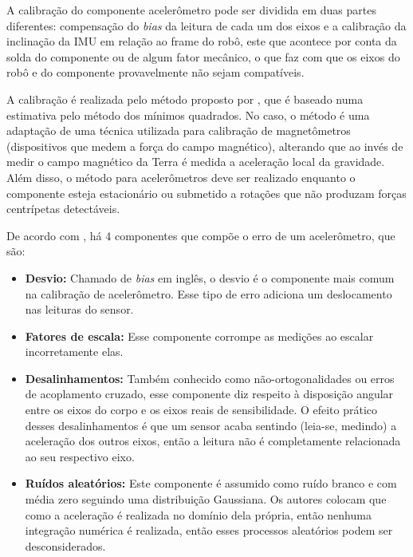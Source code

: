 \documentclass[acronym, symbols, table]{fei}
\begin{document}
			A calibração do componente acelerômetro pode ser dividida em duas partes diferentes: compensação do \textit{bias} da leitura de cada um dos eixos e a calibração da inclinação da IMU em relação ao frame do robô, este que acontece por conta da solda do componente ou de algum fator mecânico, o que faz com que os eixos do robô e do componente provavelmente não sejam compatíveis.
			
			A calibração é realizada pelo método proposto por \textcite{menezes2020triaxial}, que é baseado numa estimativa pelo método dos mínimos quadrados. No caso, o método é uma adaptação de uma técnica utilizada para calibração de magnetômetros (dispositivos que medem a força do campo magnético), alterando que ao invés de medir o campo magnético da Terra é medida a aceleração local da gravidade. Além disso, o método para acelerômetros deve ser realizado enquanto o componente esteja estacionário ou submetido a rotações que não produzam forças centrípetas detectáveis.
			
			De acordo com \textcite{menezes2020triaxial}, há 4 componentes que compõe o erro de um acelerômetro, que são:
			
			\begin{itemize}
				\item \textbf{Desvio:} Chamado de \textit{bias} em inglês, o desvio é o componente mais comum na calibração de acelerômetro. Esse tipo de erro adiciona um deslocamento nas leituras do sensor.
				
				\item \textbf{Fatores de escala:} Esse componente corrompe as medições ao escalar incorretamente elas.
				
				\item \textbf{Desalinhamentos:} Também conhecido como não-ortogonalidades ou erros de acoplamento cruzado, esse componente diz respeito à disposição angular entre os eixos do corpo e os eixos reais de sensibilidade. O efeito prático desses desalinhamentos é que um sensor acaba sentindo (leia-se, medindo) a aceleração dos outros eixos, então a leitura não é completamente relacionada ao seu respectivo eixo.
				
				\item \textbf{Ruídos aleatórios:} Este componente é assumido como ruído branco e com média zero seguindo uma distribuição Gaussiana. Os autores colocam que como a aceleração é realizada no domínio dela própria, então nenhuma integração numérica é realizada, então esses processos aleatórios podem ser desconsiderados.
			\end{itemize}
			
\end{document}
